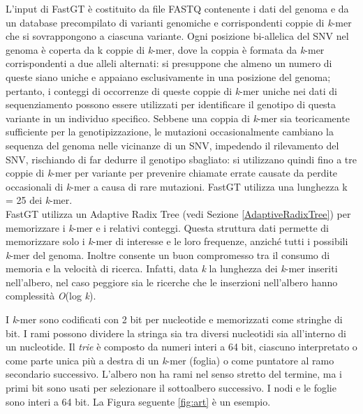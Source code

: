 \documentclass[../main.tex]{subfiles}
\begin{document}
L'input di FastGT è costituito da file FASTQ contenente i dati del genoma e da un database precompilato di varianti genomiche e corrispondenti coppie di \textit{k}-mer che si sovrappongono a ciascuna variante. Ogni posizione bi-allelica del SNV nel genoma è coperta da k coppie di \textit{k}-mer, dove la coppia è formata da \textit{k}-mer corrispondenti a due alleli alternati: si presuppone che almeno un numero di queste siano uniche e appaiano esclusivamente in una posizione del genoma; pertanto, i conteggi di occorrenze di queste coppie di \textit{k}-mer uniche nei dati di sequenziamento possono essere utilizzati per identificare il genotipo di questa variante in un individuo specifico. Sebbene una coppia di \textit{k}-mer sia teoricamente sufficiente per la genotipizzazione, le mutazioni occasionalmente cambiano la sequenza del genoma nelle vicinanze di un SNV, impedendo il rilevamento del SNV, rischiando di far dedurre il genotipo sbagliato: si utilizzano quindi fino a tre coppie di \textit{k}-mer per variante per prevenire chiamate errate causate da perdite occasionali di \textit{k}-mer a causa di rare mutazioni. FastGT utilizza una lunghezza k = 25 dei \textit{k}-mer. \\

\noindent
FastGT utilizza un Adaptive Radix Tree (vedi Sezione \ref{AdaptiveRadixTree}) per memorizzare i \textit{k}-mer e i relativi conteggi. Questa struttura dati permette di memorizzare solo i \textit{k}-mer di interesse e le loro frequenze, anziché tutti i possibili \textit{k}-mer del genoma. Inoltre consente un buon compromesso tra il consumo di memoria e la velocità di ricerca. Infatti, data \textit{k} la lunghezza dei \textit{k}-mer inseriti nell'albero, nel caso peggiore sia le ricerche che le inserzioni nell'albero hanno complessità \textit{O}(log \textit{k}).

I \textit{k}-mer sono codificati con 2 bit per nucleotide e memorizzati come stringhe di bit. I rami possono dividere la stringa sia tra diversi nucleotidi sia all'interno di un nucleotide. Il \textit{trie} è composto da numeri interi a 64 bit, ciascuno interpretato o come parte unica più a destra di un \textit{k}-mer (foglia) o come puntatore al ramo secondario successivo. L'albero non ha rami nel senso stretto del termine, ma i primi bit sono usati per selezionare il sottoalbero successivo. I nodi e le foglie sono interi a 64 bit. La Figura seguente \ref{fig:art} è un esempio.
\end{document}
